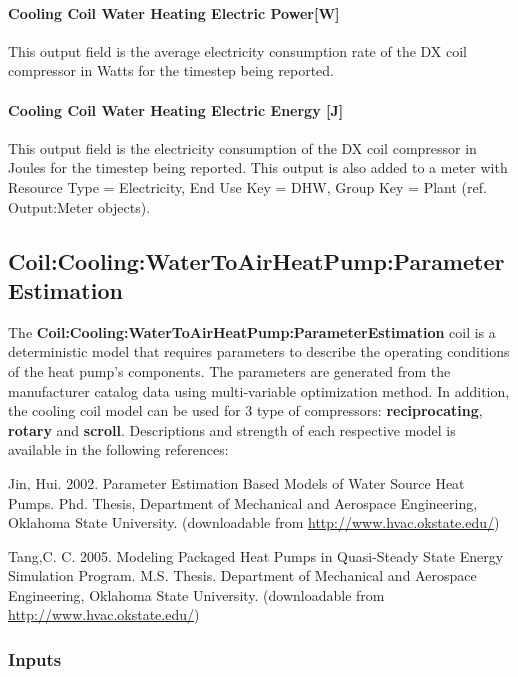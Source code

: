 \paragraph{Cooling Coil Water Heating Electric Power{[}W{]}}\label{cooling-coil-water-heating-electric-powerw-1}

This output field is the average electricity consumption rate of the DX coil compressor in Watts for the timestep being reported.

\paragraph{Cooling Coil Water Heating Electric Energy {[}J{]}}\label{cooling-coil-water-heating-electric-energy-j-1}

This output field is the electricity consumption of the DX coil compressor in Joules for the timestep being reported. This output is also added to a meter with Resource Type = Electricity, End Use Key = DHW, Group Key = Plant (ref. Output:Meter objects).

\subsection{Coil:Cooling:WaterToAirHeatPump:ParameterEstimation}\label{coilcoolingwatertoairheatpumpparameterestimation}

The \textbf{Coil:Cooling:WaterToAirHeatPump:ParameterEstimation} coil is a deterministic model that requires parameters to describe the operating conditions of the heat pump's components. The parameters are generated from the manufacturer catalog data using multi-variable optimization method. In addition, the cooling coil model can be used for 3 type of compressors: \textbf{reciprocating}, \textbf{rotary} and \textbf{scroll}. Descriptions and strength of each respective model is available in the following references:

Jin, Hui. 2002. Parameter Estimation Based Models of Water Source Heat Pumps. Phd. Thesis, Department of Mechanical and Aerospace Engineering, Oklahoma State University. (downloadable from \href{http://www.hvac.okstate.edu}{http://www.hvac.okstate.edu/})

Tang,C. C. 2005. Modeling Packaged Heat Pumps in Quasi-Steady State Energy Simulation Program. M.S. Thesis. Department of Mechanical and Aerospace Engineering, Oklahoma State University. (downloadable from \href{http://www.hvac.okstate.edu}{http://www.hvac.okstate.edu/})

\subsubsection{Inputs}\label{inputs-29}

